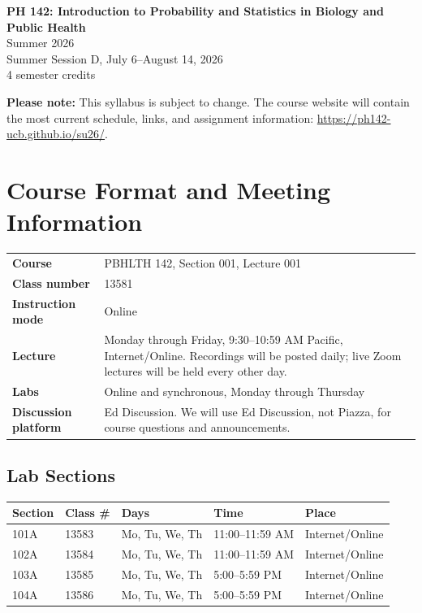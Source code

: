 \documentclass[11pt]{article}
\newcommand{\coursename}{PH 142: Introduction to Probability and Statistics in Biology and Public Health}
\newcommand{\term}{Summer 2026}
\newcommand{\website}{https://ph142-ucb.github.io/su26/}
\begin{document}
\begin{center}
{\Large \textbf{\coursename}}\\
{\large \term}\\
Summer Session D, July 6--August 14, 2026\\
4 semester credits
\end{center}

\textbf{Please note:} This syllabus is subject to change. The course website
will contain the most current schedule, links, and assignment information:
\href{\website}{\website}.

\section*{Course Format and Meeting Information}

\begin{tabularx}{\textwidth}{>{\bfseries}p{1.55in}X}
Course & PBHLTH 142, Section 001, Lecture 001\\
Class number & 13581\\
Instruction mode & Online\\
Lecture & Monday through Friday, 9:30--10:59 AM Pacific, Internet/Online. Recordings will be posted daily; live Zoom lectures will be held every other day.\\
Labs & Online and synchronous, Monday through Thursday\\
Discussion platform & Ed Discussion. We will use Ed Discussion, not Piazza, for course questions and announcements.\\
\end{tabularx}

\subsection*{Lab Sections}

\begin{tabularx}{\textwidth}{llllX}
\toprule
Section & Class \# & Days & Time & Place\\
\midrule
101A & 13583 & Mo, Tu, We, Th & 11:00--11:59 AM & Internet/Online\\
102A & 13584 & Mo, Tu, We, Th & 11:00--11:59 AM & Internet/Online\\
103A & 13585 & Mo, Tu, We, Th & 5:00--5:59 PM & Internet/Online\\
104A & 13586 & Mo, Tu, We, Th & 5:00--5:59 PM & Internet/Online\\
\bottomrule
\end{tabularx}
\end{document}
